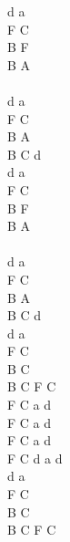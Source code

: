 \documentclass[a5paper, 10pt]{book}
\begin{document}
\begin{minipage}[t]{0.4\textwidth}
d a\\
F C\\
B F\\
B A\\
\\
d a\\
F C\\
B A\\
B C d \\

d a\\
F C\\
B F\\
B A\\
\\
d a\\
F C\\
B A\\
B C d \\

d a  \\
F C  \\
B C  \\
B C F C\\

F C a d \\
F C a d \\
F C a d \\
F C d a d\\

d a  \\
F C  \\
B C  \\
B C F C\\
\end{minipage}

\newpage
\end{document}
